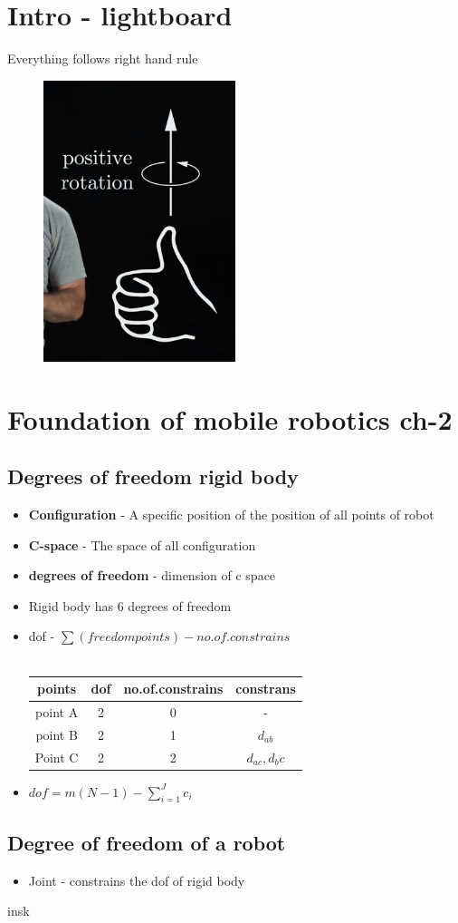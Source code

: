 \documentclass[a4paper]{article}
\begin{document}
\section{Intro - lightboard}
Everything follows right hand rule
\begin{figure}[htpb]
	\centering
	\includegraphics[width=0.5\textwidth]{postiveRotaion.png}
	\caption{}
	\label{fig:}
\end{figure}
\section{Foundation of mobile robotics ch-2}
\subsection{Degrees of freedom rigid body}
\begin{itemize}
	\item \textbf{Configuration} - A specific position of the position of all points of robot
	\item \textbf{C-space} - The space of all configuration
	\item \textbf{degrees of freedom} - dimension of c space
	\item Rigid body has 6 degrees of freedom

	\item dof - $\sum (freedom points) - no.of.constrains$ \\\
                        \begin{tabular}{|c|c|c|c|}
                        \hline
                        points & dof & no.of.constrains & constrans \\
                        \hline
                        point A & 2 & 0 & - \\ 
                        point B & 2 & 1 & $d_{ab}$ \\ 
                        Point C & 2 & 2 & $d_{ac},{d_bc}$ \\
                        \hline
                        \end{tabular}
	\item $dof = m(N-1) - \sum_{i=1}^J c_i$
\end{itemize}
\subsection{Degree of freedom of a robot}
\begin{itemize}
        \item Joint - constrains the dof of rigid body
\end{itemize}
insk
\end{document}
